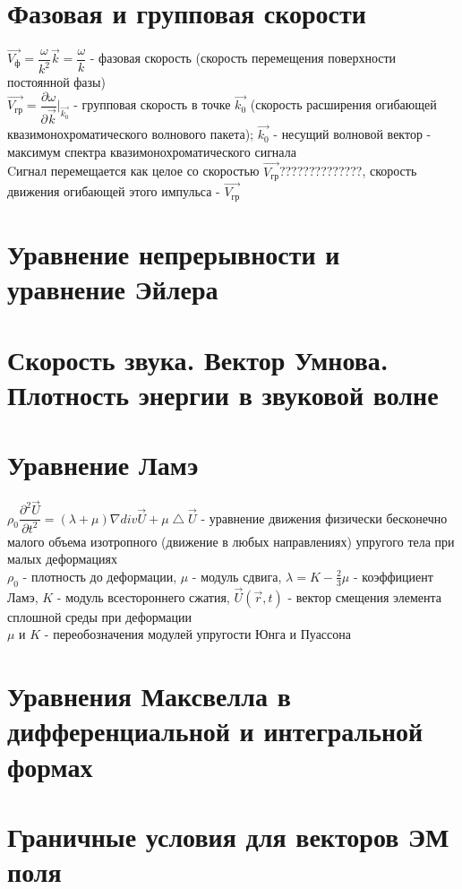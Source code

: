 \begin{multicols*}{2}
		\section{Фазовая и групповая скорости}
		$\vec{V_\text{ф}} = \dfrac{\omega}{k^2} \vec{k} = \dfrac{\omega}{k}$ - фазовая скорость (скорость перемещения поверхности постоянной фазы)\\
		$\vec{V_\text{гр}} = \dfrac{\partial\omega}{\partial \vec{k}}\bigg|_{\vec{k_0}}$ - групповая скорость в точке $\vec{k_0}$ (скорость расширения огибающей квазимонохроматического волнового пакета); $\vec{k_0}$ - несущий волновой вектор - максимум спектра квазимонохроматического сигнала\\
		Cигнал перемещается как целое со скоростью $\vec{V_\text{гр}}$??????????????, скорость движения огибающей этого импульса - $\vec{V_\text{гр}}$

		\section{Уравнение непрерывности и уравнение Эйлера}

		\section{Скорость звука. Вектор Умнова. Плотность энергии в звуковой волне}

		\section{Уравнение Ламэ}
		$\rho_0 \dfrac{\partial^2 \vec{U}}{\partial t^2} = (\lambda + \mu) \nabla div \vec{U} + \mu \bigtriangleup  \vec{U}$ - уравнение движения физически бесконечно малого объема изотропного (движение в любых направлениях) упругого тела при малых деформациях\\
		$\rho_0$ - плотность до деформации, $\mu$ - модуль сдвига, $\lambda = K - \frac{2}{3}\mu$ - коэффициент Ламэ, $K$ - модуль всестороннего сжатия, $\vec{U}(\vec{r}, t)$ - вектор смещения элемента сплошной среды при деформации\\
		$\mu$ и $K$ - переобозначения модулей упругости Юнга и Пуассона

		\section{Уравнения Максвелла в дифференциальной и интегральной формах}

		\section{Граничные условия для векторов ЭМ поля}


\end{multicols*}
